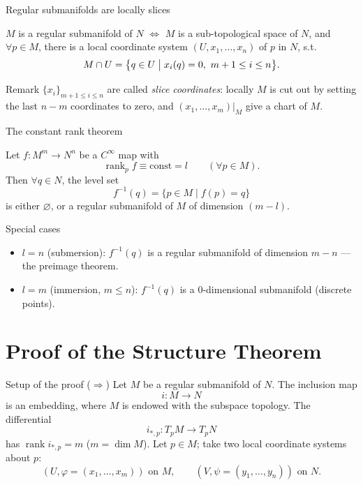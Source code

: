 \documentclass[10pt]{beamer}
\begin{document}
\begin{frame}{Regular submanifolds are locally slices}
	\begin{theorem}
		$M$ is a regular submanifold of $N$ $\Longleftrightarrow$ $M$ is
		a sub-topological space of $N$, and $\forall p \in M$, there is a
		local coordinate system $(U, x_{1}, \dots, x_{n})$ of $p$ in $N$,
		s.t.
		\[
			M \cap U
			= \bigl\{ q \in U \bigm|
			x_{i}(q) = 0,\ m+1 \leq i \leq n \bigr\}.
		\]
	\end{theorem}
	\begin{block}{Remark}
		$\{ x_{i} \}_{m+1 \leq i \leq n}$ are called \emph{slice
			coordinates}: locally $M$ is cut out by setting the last
		$n - m$ coordinates to zero, and $(x_{1}, \dots, x_{m})\big|_{M}$
		give a chart of $M$.
	\end{block}
\end{frame}

\begin{frame}{The constant rank theorem}
	\begin{theorem}
		Let $f : M^{m} \longrightarrow N^{n}$ be a $C^{\infty}$ map with
		\[
			\operatorname{rank}_{p} f \equiv \mathrm{const} = l
			\qquad (\forall p \in M).
		\]
		Then $\forall q \in N$, the level set
		\[
			f^{-1}(q) = \{ p \in M \mid f(p) = q \}
		\]
		is either $\varnothing$, or a regular submanifold of $M$ of
		dimension $(m - l)$.
	\end{theorem}
	\medskip
	\begin{block}{Special cases}
		\begin{itemize}
			\item $l = n$ (submersion): $f^{-1}(q)$ is a regular
			      submanifold of dimension $m - n$ --- the preimage
			      theorem.
			\item $l = m$ (immersion, $m \leq n$): $f^{-1}(q)$ is a
			      $0$-dimensional submanifold (discrete points).
		\end{itemize}
	\end{block}
\end{frame}

\section{Proof of the Structure Theorem}

\begin{frame}{Setup of the proof ($\Rightarrow$)}
	Let $M$ be a regular submanifold of $N$. The inclusion map
	\[
		i : M \longrightarrow N
	\]
	is an embedding, where $M$ is endowed with the subspace topology.
	The differential
	\[
		i_{*, p} : T_{p} M \longrightarrow T_{p} N
	\]
	has $\operatorname{rank} i_{*, p} = m$ ($m = \dim M$). Let $p \in M$;
	take two local coordinate systems about $p$:
	\[
		(U, \varphi = (x_{1}, \dots, x_{m})) \text{ on } M,
		\qquad
		(V, \psi = (y_{1}, \dots, y_{n})) \text{ on } N.
	\]
\end{frame}
\end{document}

